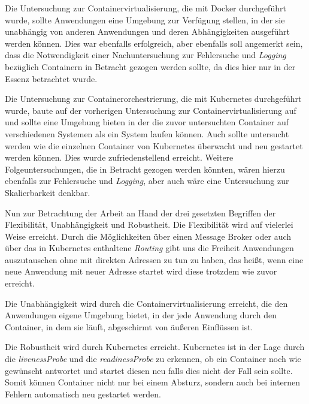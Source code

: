 \documentclass[12pt,a4paper]{scrartcl}
\begin{document}
Die Untersuchung zur Containervirtualisierung, die mit Docker durchgeführt wurde, sollte Anwendungen eine Umgebung zur Verfügung stellen, in der sie unabhängig von anderen Anwendungen und deren Abhängigkeiten ausgeführt werden können. Dies war ebenfalls erfolgreich, aber ebenfalls soll angemerkt sein, dass die Notwendigkeit einer Nachuntersuchung zur Fehlersuche und \emph{Logging} bezüglich Containern in Betracht gezogen werden sollte, da dies hier nur in der Essenz betrachtet wurde.

Die Untersuchung zur Containerorchestrierung, die mit Kubernetes durchgeführt wurde, baute auf der vorherigen Untersuchung zur Containervirtualisierung auf und sollte eine Umgebung bieten in der die zuvor untersuchten Container auf verschiedenen Systemen als ein System laufen können. Auch sollte untersucht werden wie die einzelnen Container von Kubernetes überwacht und neu gestartet werden können. Dies wurde zufriedenstellend erreicht. Weitere Folgeuntersuchungen, die in Betracht gezogen werden könnten, wären hierzu ebenfalls zur Fehlersuche und \emph{Logging}, aber auch wäre eine Untersuchung zur Skalierbarkeit denkbar.

Nun zur Betrachtung der Arbeit an Hand der drei gesetzten Begriffen der Flexibilität, Unabhängigkeit und Robustheit.
Die Flexibilität wird auf vielerlei Weise erreicht. Durch die Möglichkeiten über einen Message Broker oder auch über das in Kubernetes enthaltene \emph{Routing} gibt uns die Freiheit Anwendungen auszutauschen ohne mit direkten Adressen zu tun zu haben, das heißt, wenn eine neue Anwendung mit neuer Adresse startet wird diese trotzdem wie zuvor erreicht. 

Die Unabhängigkeit wird durch die Containervirtualisierung erreicht, die den Anwendungen eigene Umgebung bietet, in der jede Anwendung durch den Container, in dem sie läuft, abgeschirmt von äußeren Einflüssen ist.

Die Robustheit wird durch Kubernetes erreicht. Kubernetes ist in der Lage durch die \emph{livenessProbe} und die \emph{readinessProbe} zu erkennen, ob ein Container noch wie gewünscht antwortet und startet diesen neu falls dies nicht der Fall sein sollte. Somit können Container nicht nur bei einem Absturz, sondern auch bei internen Fehlern automatisch neu gestartet werden.






\newpage


\printbibliography
{}
\end{document}
